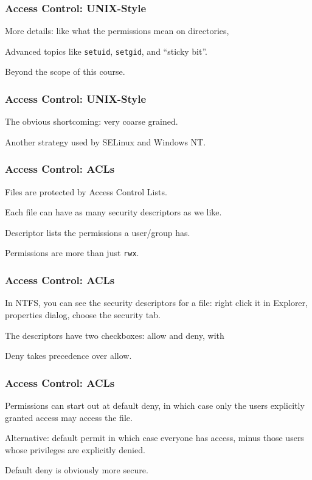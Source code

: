 \begin{frame}
\frametitle{Access Control: UNIX-Style}
\begin{changemargin}{1cm}

More details: like what the permissions mean on directories, 

Advanced topics like \texttt{setuid}, \texttt{setgid}, and ``sticky bit''.

Beyond the scope of this course.

\end{changemargin}
\end{frame}

\begin{frame}
\frametitle{Access Control: UNIX-Style}
\begin{changemargin}{1cm}

The obvious shortcoming: very coarse grained.

Another strategy used by SELinux and Windows NT.

\end{changemargin}
\end{frame}

\begin{frame}
\frametitle{Access Control: ACLs}
\begin{changemargin}{1cm}

Files are protected by Access Control Lists.

Each file can have as many security descriptors as we like.

Descriptor lists the permissions a user/group has.

Permissions are more than just \texttt{rwx}.

\end{changemargin}
\end{frame}

\begin{frame}
\frametitle{Access Control: ACLs}
\begin{changemargin}{1cm}

In NTFS, you can see the security descriptors for a file: right click it in Explorer, properties dialog, choose the security tab. 

The descriptors have two checkboxes: allow and deny, with 

Deny takes precedence over allow.

\end{changemargin}
\end{frame}

\begin{frame}
\frametitle{Access Control: ACLs}
\begin{changemargin}{1cm}

Permissions can start out at \alert{default deny}, in which case only the users explicitly granted access may access the file.

Alternative: \alert{default permit} in which case everyone has access, minus those users whose privileges are explicitly denied. 

Default deny is obviously more secure.

\end{changemargin}
\end{frame}

